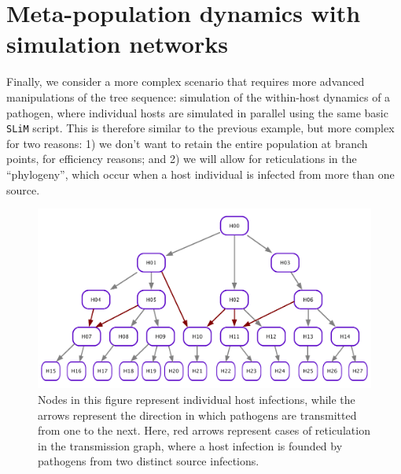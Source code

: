 \documentclass[12pt]{article}
\newcommand{\slim}[0]{\texttt{SLiM}\xspace}
\begin{document}
\section{Meta-population dynamics with simulation networks}

Finally, we consider a more complex scenario that requires more advanced manipulations of the tree sequence:
simulation of the within-host dynamics of a pathogen,
where individual hosts are simulated in parallel using the same basic \slim script.
This is therefore similar to the previous example, but more complex for two reasons:
1) we don't want to retain the entire population at branch points, for efficiency reasons; and
2) we will allow for reticulations in the ``phylogeny'',
which occur when a host individual is infected from more than one source.



\begin{figure}[h!]
    \centering
     \includegraphics[width=\textwidth]{figures/DAG_w_reticulation.pdf}
     \caption{
        Nodes in this figure represent individual host infections, while the arrows represent the direction in which pathogens are transmitted from one to the next. Here, red arrows represent cases of reticulation in the transmission graph, where a host infection is founded by pathogens from two distinct source infections.
     \label{fig:DAG_w_reticulation}
     }
\end{figure}
\end{document}
